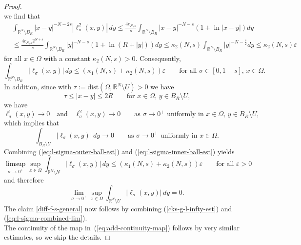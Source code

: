 \documentclass[notitlepage,11pt,reqno]{amsart}
\theoremstyle{definition}
\numberwithin{equation}{section}
\newcommand{\eps}{{\varepsilon}}
\newcommand{\R}{\mathds{R}}
\begin{document}
\begin{proof}
$$  $$
we find that
  \begin{align*}
    &\int_{\R^N \setminus B_R}|x-y|^{-N-2s}|\ell^2_{\sigma}(x,y)|\,dy \le \frac{4c_{N,s}}{s}\int_{\R^N \setminus B_R}|x-y|^{-N-s}(1+\ln |x-y|)dy\\
    &\le \frac{4c_{N,s}2^{N+s}}{s}\int_{\R^N \setminus B_R}|y|^{-N-s}(1+ \ln (R+|y|))dy\le \kappa_2(N,s)
\int_{\R^N \setminus B_R}|y|^{-N-\frac{s}{2}}dy \le \kappa_2(N,s) \eps
  \end{align*}
  for all $x \in \Omega$  with a constant $\kappa_2(N,s)>0$.
  Consequently,
  \begin{equation}
    \label{eq:l-sigma-outer-ball-est}
    \int_{\R^N \setminus B_R}|\ell_{\sigma}(x,y)|\,dy \le (\kappa_1(N,s) + \kappa_2(N,s)) \eps \qquad \text{for all $\sigma \in [0,1-s]$, $x \in \Omega$.}
  \end{equation}
  In addition, since with $\tau:=\text{dist} (\Omega, \R^N \setminus U)>0$ we have
  $$
  \tau \le |x-y| \le 2 R \qquad \text{for $x \in \Omega$, $y \in B_R \setminus U$,}
  $$
  we have
$$
\ell_\sigma^1(x,y) \to 0 \quad \text{and}\quad \ell_\sigma^{2}(x,y) \to 0 \qquad \text{as $\sigma \to 0^+$ uniformly in $x \in \Omega$, $y \in B_R \setminus U$,}
$$
which implies that
  \begin{equation}
    \label{eq:l-sigma-inner-ball-est}
    \int_{B_R \setminus U}|\ell_{\sigma}(x,y)|\,dy  \to 0 \qquad \text{as $\sigma \to 0^+$ uniformly in $x \in \Omega$.}
  \end{equation}
  Combining (\ref{eq:l-sigma-outer-ball-est}) and (\ref{eq:l-sigma-inner-ball-est}) yields
$$ 
   \limsup_{\sigma \to 0^+}\sup_{x \in \Omega} \int_{\R^N \setminus N}|\ell_{\sigma}(x,y)|\,dy \le (\kappa_1(N,s) + \kappa_2(N,s)) \eps
   \qquad \text{for all $\eps>0$}
$$
and therefore
  \begin{equation}
   \label{eq:l-sigma-combined-lim}
   \lim_{\sigma \to 0^+}\sup_{x \in \Omega} \int_{\R^N \setminus U}|\ell_{\sigma}(x,y)|\,dy =0.
\end{equation}
The claim \ref{diff-f-s-general} now follows by combining (\ref{cks-g-l-infty-est}) and (\ref{eq:l-sigma-combined-lim}).\\
The continuity of the map in~(\ref{eq:add-continuity-map}) follows by very similar estimates, so we skip the details.
    \end{proof}
\end{document}
